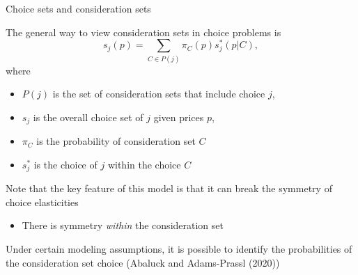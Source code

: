 \documentclass[notes,11pt, aspectratio=169]{beamer}
\newenvironment{wideitemize}{\itemize\addtolength{\itemsep}{10pt}}{\enditemize}
\begin{document}
\begin{frame}{Choice sets and consideration sets}
  \begin{wideitemize}
  \item The general way to view consideration sets in choice problems
    is
  \begin{equation*}
    s_{j}(p) = \sum_{C \in P(j)} \pi_{C}(p) s_{j}^{*}(p | C),
  \end{equation*}
  where
  \begin{itemize}
  \item $P(j)$ is the set of consideration sets that include choice $j$,
  \item  $s_{j}$ is the overall choice set of $j$ given prices $p$,
  \item  $\pi_{C}$ is the probability of consideration set $C$
  \item   $s_{j}^{*}$ is the choice of $j$ within the choice $C$ 
  \end{itemize}
\item Note that the key feature of this model is that it can break the
  symmetry of choice elasticities
  \begin{itemize}
  \item There is symmetry \emph{within} the consideration set
  \end{itemize}
\item Under certain modeling assumptions, it is possible to identify
  the probabilities of the consideration set choice (Abaluck and
  Adams-Prassl (2020))
\end{wideitemize}
\end{frame}
\end{document}
